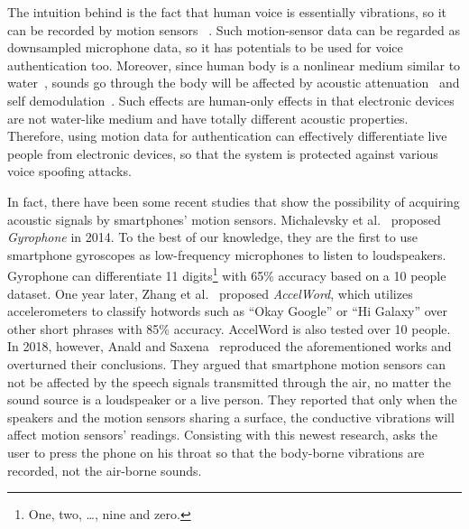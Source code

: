 The intuition behind {\shortname} is the fact that human voice is essentially vibrations, so it can be recorded by motion sensors ~\cite{hopkin2003getting,o2009sonic,michalevsky2014gyrophone}.  Such motion-sensor data can be regarded as downsampled microphone data, so it has potentials to be used for voice authentication too. 
%
Moreover, since human body is a nonlinear medium similar to water~\cite{kim2014sound}, sounds go through the body will be affected by acoustic attenuation~\cite{szabo1994time} and self demodulation~\cite{berktay1965possible}. Such effects are human-only effects in that electronic devices are not water-like medium and have totally different acoustic properties. Therefore, using motion data for authentication can effectively differentiate live people from electronic devices, so that the system is protected against various voice spoofing attacks.

In fact,  there have been some recent studies that show the possibility of acquiring acoustic signals by smartphones' motion sensors. Michalevsky et al.~\cite{michalevsky2014gyrophone} proposed \textit{Gyrophone} in 2014. To the best of our knowledge, they are the first to use smartphone gyroscopes as low-frequency microphones to listen to loudspeakers. Gyrophone can differentiate 11 digits\footnote{One, two, \ldots, nine and zero.} with 65\% accuracy based on a 10 people dataset.
%
One year later, Zhang et al.~\cite{zhang2015accelword} proposed \textit{AccelWord}, which utilizes accelerometers to classify hotwords such as ``Okay Google'' or ``Hi Galaxy'' over other short phrases with 85\% accuracy. AccelWord is also tested over 10 people.
%
In 2018, however, Anald and Saxena~\cite{anand2018speechless} reproduced the aforementioned works and overturned their conclusions. They argued that smartphone motion sensors can not be affected by the speech signals transmitted through the air, no matter the sound source is a loudspeaker or a live person. They reported that only when the speakers and the motion sensors sharing a surface,  the  conductive vibrations will affect motion sensors' readings. Consisting with this newest research, {\shortname} asks the user to press the phone on his throat so that the body-borne vibrations are recorded, not the air-borne sounds.




